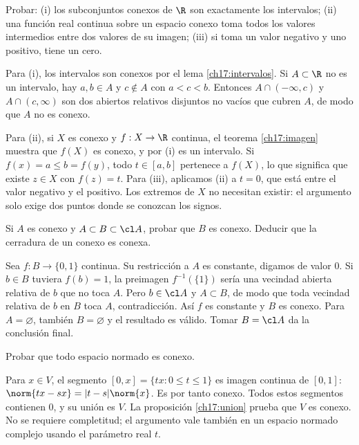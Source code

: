 \begin{ejercicio}\label{ej:lectura-17-2}
Probar: (i) los subconjuntos conexos de $\R$ son exactamente los intervalos; (ii) una función real continua sobre un espacio conexo toma todos los valores intermedios entre dos valores de su imagen; (iii) si toma un valor negativo y uno positivo, tiene un cero.
\end{ejercicio}
\begin{solucion}
Para (i), los intervalos son conexos por el lema \ref{ch17:intervalos}. Si $A\subset\R$ no es un intervalo, hay $a,b\in A$ y $c\notin A$ con $a<c<b$. Entonces $A\cap(-\infty,c)$ y $A\cap(c,\infty)$ son dos abiertos relativos disjuntos no vacíos que cubren $A$, de modo que $A$ no es conexo.

Para (ii), si $X$ es conexo y $f:X\to\R$ continua, el teorema \ref{ch17:imagen} muestra que $f(X)$ es conexo, y por (i) es un intervalo. Si $f(x)=a\le b=f(y)$, todo $t\in[a,b]$ pertenece a $f(X)$, lo que significa que existe $z\in X$ con $f(z)=t$. Para (iii), aplicamos (ii) a $t=0$, que está entre el valor negativo y el positivo. Los extremos de $X$ no necesitan existir: el argumento solo exige dos puntos donde se conozcan los signos.
\end{solucion}

\begin{ejercicio}\label{ej:lectura-17-3}
Si $A$ es conexo y $A\subset B\subset\cl A$, probar que $B$ es conexo. Deducir que la cerradura de un conexo es conexa.
\end{ejercicio}
\begin{solucion}
Sea $f:B\to\{0,1\}$ continua. Su restricción a $A$ es constante, digamos de valor $0$. Si $b\in B$ tuviera $f(b)=1$, la preimagen $f^{-1}(\{1\})$ sería una vecindad abierta relativa de $b$ que no toca $A$. Pero $b\in\cl A$ y $A\subset B$, de modo que toda vecindad relativa de $b$ en $B$ toca $A$, contradicción. Así $f$ es constante y $B$ es conexo. Para $A=\varnothing$, también $B=\varnothing$ y el resultado es válido. Tomar $B=\cl A$ da la conclusión final.
\end{solucion}

\begin{ejercicio}\label{ej:lectura-17-4}
Probar que todo espacio normado es conexo.
\end{ejercicio}
\begin{solucion}
Para $x\in V$, el segmento $[0,x]=\{tx:0\le t\le1\}$ es imagen continua de $[0,1]$: $\norm{tx-sx}=|t-s|\norm{x}$. Es por tanto conexo. Todos estos segmentos contienen $0$, y su unión es $V$. La proposición \ref{ch17:union} prueba que $V$ es conexo. No se requiere completitud; el argumento vale también en un espacio normado complejo usando el parámetro real $t$.
\end{solucion}

